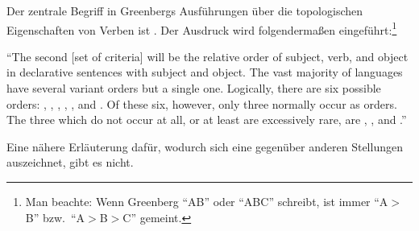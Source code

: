 \documentclass[output=paper]{langsci/langscibook}
\begin{document}
\ssubsection{}%
\label{subsec:1-2.1}
Der zentrale Begriff in Greenbergs Ausführungen über die topologischen Eigenschaften von Verben ist
. Der Ausdruck wird folgendermaßen eingeführt:\footnote{%
  Man beachte: Wenn Greenberg "`AB"' oder "`ABC"' schreibt, ist immer "`A$>$B"' bzw.\ "`A$>$B$>$C"' gemeint.%
}
\begin{exe}
\ex\label{ex:1-2-1}
\begin{xlist}
\ex\label{ex:1-2-1a} "`The second [set of criteria] will be the relative order of subject, verb, and
object in declarative sentences with  subject and object.
\ex\label{ex:1-2-1b} The vast majority of languages have several variant orders but a single  one.
\ex\label{ex:1-2-1c} Logically, there are six possible orders: , , , , , and
.
\ex\label{ex:1-2-1d} Of these six, however, only three normally occur as  orders.
\ex\label{ex:1-2-1e} The three which do not occur at all, or at least are excessively rare, are ,
, and ."' \citep[76]{Greenberg1963}
\end{xlist}
\end{exe}
Eine nähere Erläuterung dafür, wodurch sich eine  gegenüber anderen Stellungen auszeichnet, gibt es nicht.
\end{document}
